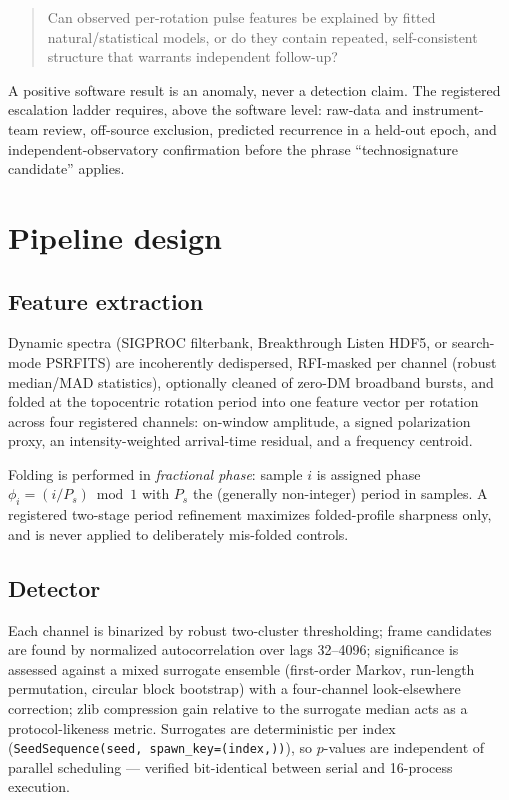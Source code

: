 \documentclass[11pt]{article}
\begin{document}
\begin{quote}
Can observed per-rotation pulse features be explained by fitted
natural/statistical models, or do they contain repeated, self-consistent
structure that warrants independent follow-up?
\end{quote}

A positive software result is an anomaly, never a detection claim. The
registered escalation ladder requires, above the software level: raw-data and
instrument-team review, off-source exclusion, predicted recurrence in a
held-out epoch, and independent-observatory confirmation before the phrase
``technosignature candidate'' applies.

\section{Pipeline design}

\subsection{Feature extraction}
Dynamic spectra (SIGPROC filterbank, Breakthrough Listen HDF5, or search-mode
PSRFITS) are incoherently dedispersed, RFI-masked per channel (robust
median/MAD statistics), optionally cleaned of zero-DM broadband bursts, and
folded at the topocentric rotation period into one feature vector per rotation
across four registered channels: on-window amplitude, a signed polarization
proxy, an intensity-weighted arrival-time residual, and a frequency centroid.

Folding is performed in \emph{fractional phase}: sample $i$ is assigned phase
$\phi_i = (i / P_s) \bmod 1$ with $P_s$ the (generally non-integer) period in
samples. A registered two-stage period refinement maximizes folded-profile
sharpness only, and is never applied to deliberately mis-folded controls.

\subsection{Detector}
Each channel is binarized by robust two-cluster thresholding; frame candidates
are found by normalized autocorrelation over lags 32--4096; significance is
assessed against a mixed surrogate ensemble (first-order Markov, run-length
permutation, circular block bootstrap) with a four-channel look-elsewhere
correction; zlib compression gain relative to the surrogate median acts as a
protocol-likeness metric. Surrogates are deterministic per index
(\texttt{SeedSequence(seed, spawn\_key=(index,))}), so $p$-values are
independent of parallel scheduling --- verified bit-identical between serial
and 16-process execution.
\end{document}
